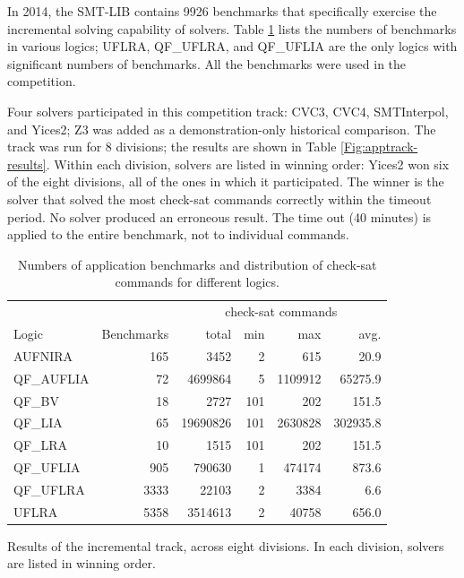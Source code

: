 \documentclass[twoside,11pt]{article}
\begin{document}
In 2014, the SMT-LIB contains 9926 benchmarks that  specifically  exercise the incremental solving capability of solvers. Table \ref{Fig:apptrack-benchmarks} lists the numbers of benchmarks in various logics; UFLRA, QF\_UFLRA, and QF\_UFLIA are the only logics with significant numbers of benchmarks. All the benchmarks were used in the competition.

Four solvers participated in this competition track: CVC3, CVC4, SMTInterpol, and Yices2; Z3 was added as a demonstration-only historical comparison. The track was run for 8 divisions; the results are shown in Table \ref{Fig:apptrack-results}. Within each division, solvers are listed in winning order: Yices2 won six of the eight divisions, all of the ones in which it participated. The winner is the solver that solved the most check-sat commands correctly within the timeout period. No solver produced an erroneous result. The time out (40 minutes) is applied to the entire benchmark, not to individual commands.

\begin{table}
\centering
\begin{tabular}{|l|r|rrrr|}
\hline
&  & \multicolumn{4}{c|}{check-sat commands} \\
 Logic & Benchmarks & total & min & max & avg. \\
\hline
AUFNIRA & 165  & 3452 & 2 & 615 & 20.9 \\
QF\_AUFLIA & 72 & 4699864 & 5 & 1109912 & 65275.9 \\
QF\_BV & 18 & 2727 & 101 & 202 & 151.5 \\
QF\_LIA & 65 & 19690826 & 101 & 2630828 & 302935.8 \\
QF\_LRA & 10 & 1515 & 101 & 202 & 151.5 \\
QF\_UFLIA & 905 & 790630 & 1 & 474174 & 873.6 \\
QF\_UFLRA & 3333 & 22103 & 2 & 3384 & 6.6 \\
UFLRA & 5358 & 3514613 & 2 & 40758 & 656.0 \\
\hline
\end{tabular}
\caption{Numbers of application benchmarks and distribution of check-sat commands for different logics.}
\label{Fig:apptrack-benchmarks}
\end{table}
 

\begin{table}
\centering

\caption{Results of the incremental track, across eight divisions. In each division, solvers are listed in winning order.}
\label{Fig:apptrack-results}
\end{table}
\end{document}
